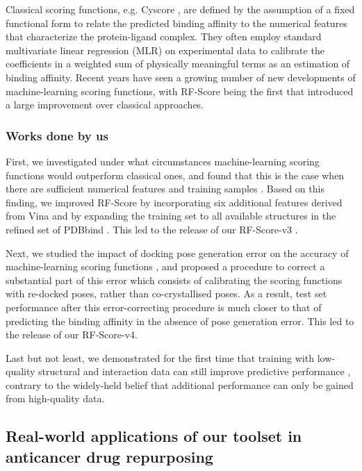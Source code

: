 \documentclass[a4paper,12pt]{article}
\begin{document}
Classical scoring functions, e.g. Cyscore \cite{1372}, are defined by the assumption of a fixed functional form to relate the predicted binding affinity to the numerical features that characterize the protein-ligand complex. They often employ standard multivariate linear regression (MLR) on experimental data to calibrate the coefficients in a weighted sum of physically meaningful terms as an estimation of binding affinity. Recent years have seen a growing number of new developments of machine-learning scoring functions, with RF-Score \cite{564} being the first that introduced a large improvement over classical approaches.

\subsubsection*{Works done by us}

First, we investigated under what circumstances machine-learning scoring functions would outperform classical ones, and found that this is the case when there are sufficient numerical features and training samples \cite{1432}. Based on this finding, we improved RF-Score by incorporating six additional features derived from Vina \cite{595} and by expanding the training set to all available structures in the refined set of PDBbind \cite{1633}. This led to the release of our RF-Score-v3 \cite{1647}.

Next, we studied the impact of docking pose generation error on the accuracy of machine-learning scoring functions \cite{1434}, and proposed a procedure to correct a substantial part of this error which consists of calibrating the scoring functions with re-docked poses, rather than co-crystallised poses. As a result, test set performance after this error-correcting procedure is much closer to that of predicting the binding affinity in the absence of pose generation error. This led to the release of our RF-Score-v4.

Last but not least, we demonstrated for the first time that training with low-quality structural and interaction data can still improve predictive performance \cite{1663}, contrary to the widely-held belief that additional performance can only be gained from high-quality data.

\subsection*{Real-world applications of our toolset in anticancer drug repurposing}
\end{document}
